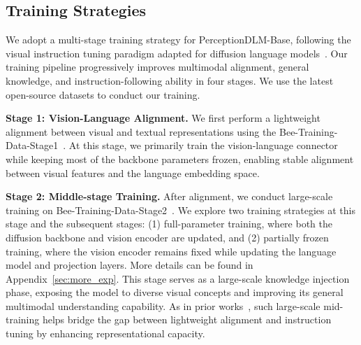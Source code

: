%
%

%

\vspace{-2mm}
\subsection{Training Strategies}



We adopt a multi-stage training strategy for PerceptionDLM-Base, following the visual instruction tuning paradigm adapted for diffusion language models~\citep{you2025llada, liu2023visual}. 
%
Our training pipeline progressively improves multimodal alignment, general knowledge, and instruction-following ability in four stages.
%
We use the latest open-source datasets to conduct our training.

\noindent
\textbf{Stage 1: Vision-Language Alignment.}
We first perform a lightweight alignment between visual and textual representations using the Bee-Training-Data-Stage1~\citep{zhang2025bee}. At this stage, we primarily train the vision-language connector while keeping most of the backbone parameters frozen, enabling stable alignment between visual features and the language embedding space.

\noindent
\textbf{Stage 2: Middle-stage Training.}
After alignment, we conduct large-scale training on Bee-Training-Data-Stage2~\citep{zhang2025bee}. 
%
We explore two training strategies at this stage and the subsequent stages: (1) full-parameter training, where both the diffusion backbone and vision encoder are updated, and (2) partially frozen training, where the vision encoder remains fixed while updating the language model and projection layers. More details can be found in Appendix~\ref{sec:more_exp}.
%
This stage serves as a large-scale knowledge injection phase, exposing the model to diverse visual concepts and improving its general multimodal understanding capability. 
%
As in prior works~\citep{li2025llava, zhang2025bee}, such large-scale mid-training helps bridge the gap between lightweight alignment and instruction tuning by enhancing representational capacity.

